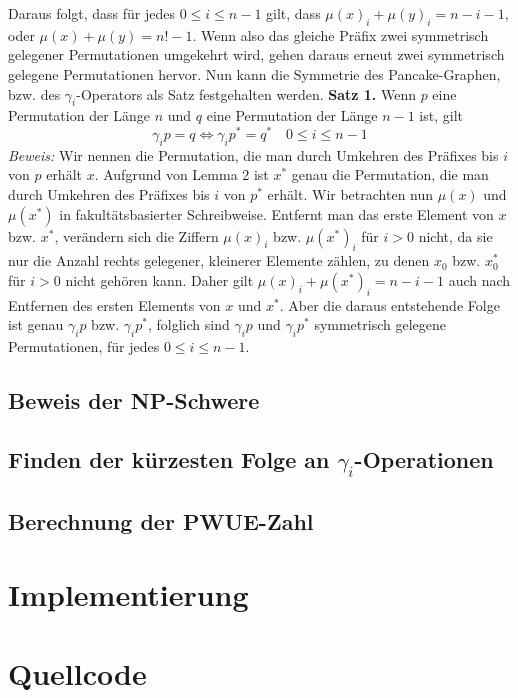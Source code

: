 \documentclass[a4paper, 11pt, ngerman]{article}
\begin{document}
Daraus folgt, dass für jedes $0 \le i \le n - 1$ gilt, dass $\mu(x)_i + \mu(y)_i = n - i-1$, oder $\mu(x) + \mu(y) = n! - 1$. Wenn also das gleiche Präfix zwei symmetrisch gelegener Permutationen umgekehrt wird, gehen daraus erneut zwei symmetrisch gelegene Permutationen hervor.
\newline \newline
Nun kann die Symmetrie des Pancake-Graphen, bzw. des $\gamma_i$-Operators als Satz festgehalten werden.
\newline \newline
\textbf{Satz 1.} Wenn $p$ eine Permutation der Länge $n$ und $q$ eine Permutation der Länge $n - 1$ ist, gilt
$$
    \gamma_i p = q \Longleftrightarrow \gamma_i p^* = q^* \quad 0 \le i \le n - 1
$$
\newline \newline
\emph{Beweis:} Wir nennen die Permutation, die man durch Umkehren des Präfixes bis $i$ von $p$ erhält $x$. Aufgrund von Lemma 2 ist $x^*$ genau die Permutation, die man durch Umkehren des Präfixes bis $i$ von $p^*$ erhält. Wir betrachten nun $\mu(x)$ und $\mu(x^*)$ in fakultätsbasierter Schreibweise. Entfernt man das erste Element von $x$ bzw. $x^*$, verändern sich die Ziffern $\mu(x)_i$ bzw. $\mu(x^*)_i$ für $i > 0$ nicht, da sie nur die Anzahl rechts gelegener, kleinerer Elemente zählen, zu denen $x_0$ bzw. $x^*_0$ für $i > 0$ nicht gehören kann. Daher gilt $\mu(x)_i + \mu(x^*)_i = n - i - 1$ auch nach Entfernen des ersten Elements von $x$ und $x^*$. Aber die daraus entstehende Folge ist genau $\gamma_i p$ bzw. $\gamma_i p^*$, folglich sind $\gamma_i p$ und $\gamma_i p^*$ symmetrisch gelegene Permutationen, für jedes $0 \le i \le n - 1$.

\subsection{Beweis der NP-Schwere}

\subsection{Finden der kürzesten Folge an $\gamma_i$-Operationen}

\subsection{Berechnung der PWUE-Zahl}

\section{Implementierung}

\section{Quellcode}
\end{document}
